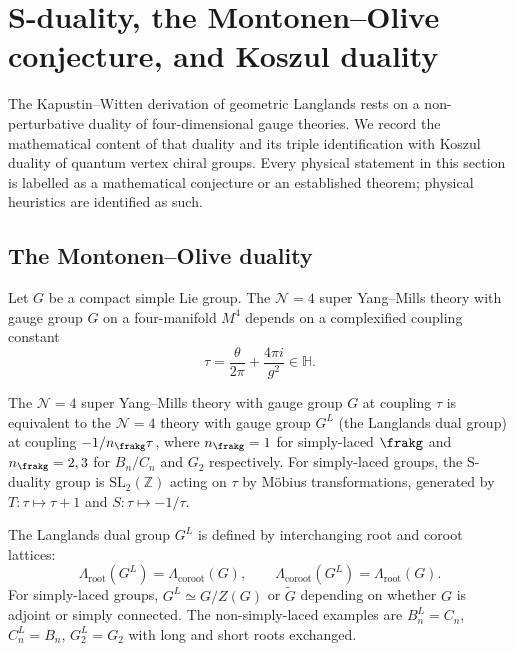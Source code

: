 \section{S-duality, the Montonen--Olive conjecture, and Koszul duality}
\label{sec:phys-sduality-koszul}

The Kapustin--Witten derivation of geometric Langlands rests on a
non-perturbative duality of four-dimensional gauge theories. We record the
mathematical content of that duality and its triple identification with
Koszul duality of quantum vertex chiral groups. Every physical statement in
this section is labelled as a mathematical conjecture or an established theorem;
physical heuristics are identified as such.

\subsection{The Montonen--Olive duality}
\label{subsec:phys-montonen-olive}

Let $G$ be a compact simple Lie group. The $\mathcal{N}=4$ super Yang--Mills
theory with gauge group $G$ on a four-manifold $M^4$ depends on a complexified
coupling constant
\[
 \tau = \frac{\theta}{2\pi} + \frac{4\pi i}{g^2} \in \mathbb{H}.
\]

\begin{conjecture}
\label{conj:phys-montonen-olive}
\ClaimStatusConjectured
The $\mathcal{N}=4$ super Yang--Mills theory with gauge group $G$ at coupling
$\tau$ is equivalent to the $\mathcal{N}=4$ theory with gauge group $G^L$
(the Langlands dual group) at coupling $-1/n_\frakg\tau$, where $n_\frakg = 1$
for simply-laced $\frakg$ and $n_\frakg = 2, 3$ for $B_n/C_n$ and $G_2$
respectively. For simply-laced groups, the S-duality group is
$\mathrm{SL}_2(\mathbb{Z})$ acting on $\tau$ by M\"{o}bius transformations,
generated by $T\colon \tau \mapsto \tau + 1$ and $S\colon \tau \mapsto -1/\tau$.
\end{conjecture}

The Langlands dual group $G^L$ is defined by interchanging root and coroot
lattices:
\[
 \Lambda_{\mathrm{root}}(G^L) = \Lambda_{\mathrm{coroot}}(G), \qquad
 \Lambda_{\mathrm{coroot}}(G^L) = \Lambda_{\mathrm{root}}(G).
\]
For simply-laced groups, $G^L \simeq G/Z(G)$ or $\widetilde{G}$ depending on
whether $G$ is adjoint or simply connected. The non-simply-laced examples are
$B_n^L = C_n$, $C_n^L = B_n$, $G_2^L = G_2$ with long and short roots
exchanged.

